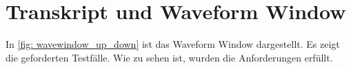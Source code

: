 \documentclass[./\jobname.tex]{subfiles}
\begin{document}
\section{Transkript und Waveform Window}
%
In \autoref{fig: wavewindow_up_down} ist das Waveform Window dargestellt. Es zeigt die geforderten Testfälle. Wie zu sehen ist, wurden die Anforderungen erfüllt.
%
\begin{figure}[H]
	\centering
	\noindent{}
	\label{fig: wavewindow_up_down}
\end{figure}
%
%
%
%
\end{document}
